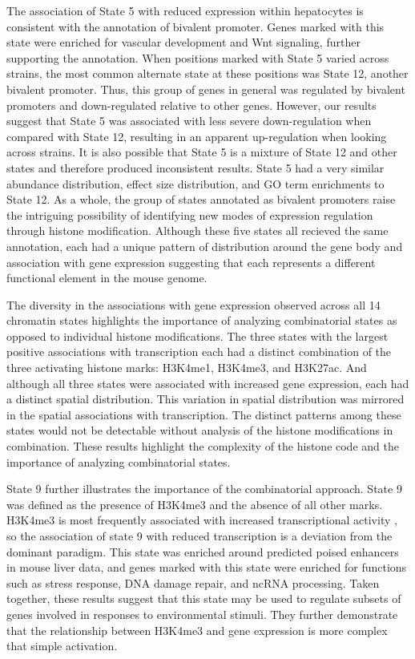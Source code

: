 \documentclass[
  11pt,
]{article}
\begin{document}
The association of State 5 with reduced expression within hepatocytes is
consistent with the annotation of bivalent promoter. Genes marked with
this state were enriched for vascular development and Wnt signaling,
further supporting the annotation. When positions marked with State 5
varied across strains, the most common alternate state at these
positions was State 12, another bivalent promoter. Thus, this group of
genes in general was regulated by bivalent promoters and down-regulated
relative to other genes. However, our results suggest that State 5 was
associated with less severe down-regulation when compared with State 12,
resulting in an apparent up-regulation when looking across strains. It
is also possible that State 5 is a mixture of State 12 and other states
and therefore produced inconsistent results. State 5 had a very similar
abundance distribution, effect size distribution, and GO term
enrichments to State 12. As a whole, the group of states annotated as
bivalent promoters raise the intriguing possibility of identifying new
modes of expression regulation through histone modification. Although
these five states all recieved the same annotation, each had a unique
pattern of distribution around the gene body and association with gene
expression suggesting that each represents a different functional
element in the mouse genome.

The diversity in the associations with gene expression observed across
all 14 chromatin states highlights the importance of analyzing
combinatorial states as opposed to individual histone modifications. The
three states with the largest positive associations with transcription
each had a distinct combination of the three activating histone marks:
H3K4me1, H3K4me3, and H3K27ac. And although all three states were
associated with increased gene expression, each had a distinct spatial
distribution. This variation in spatial distribution was mirrored in the
spatial associations with transcription. The distinct patterns among
these states would not be detectable without analysis of the histone
modifications in combination. These results highlight the complexity of
the histone code and the importance of analyzing combinatorial states.

State 9 further illustrates the importance of the combinatorial
approach. State 9 was defined as the presence of H3K4me3 and the absence
of all other marks. H3K4me3 is most frequently associated with increased
transcriptional activity
\citep{pmid15680324, pmid14661024, pmid12353038, pmid16728976}, so the
association of state 9 with reduced transcription is a deviation from
the dominant paradigm. This state was enriched around predicted poised
enhancers in mouse liver data, and genes marked with this state were
enriched for functions such as stress response, DNA damage repair, and
ncRNA processing. Taken together, these results suggest that this state
may be used to regulate subsets of genes involved in responses to
environmental stimuli. They further demonstrate that the relationship
between H3K4me3 and gene expression is more complex that simple
activation.
\end{document}
